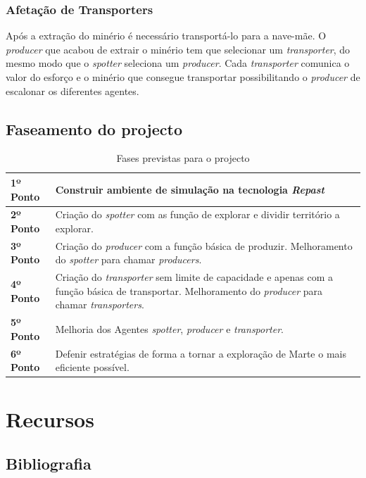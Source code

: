 \documentclass[12pt]{report}
\begin{document}
\FloatBarrier
\subsection{Afetação de Transporters}
Após a extração do minério é necessário transportá-lo para a nave-mãe. O \emph{producer} que acabou de extrair o minério tem que selecionar 
um \emph{transporter}, do mesmo modo que o \emph{spotter} seleciona um \emph{producer}. Cada \emph{transporter} comunica o valor
do esforço e o minério que consegue transportar possibilitando o \emph{producer} de escalonar os diferentes agentes.

\section{Faseamento do projecto}

\begin{table}[htb]
\centering
\caption{Fases previstas para o projecto}
    \sffamily \begin{tabularx}{1.0\textwidth}{ p{3cm}  p{} }
    \hline
    \textbf{1º Ponto} \hfill & Construir ambiente de simulação na tecnologia \emph{Repast} \\ \hline
    \textbf{2º Ponto} \hfill & Criação do \emph{spotter} com as função de explorar e dividir território a explorar. \\ \hline
    \textbf{3º Ponto} \hfill & Criação do \emph{producer} com a função básica de produzir. Melhoramento do \emph{spotter} para chamar \emph{producers}. \\ \hline
    \textbf{4º Ponto} \hfill & Criação do \emph{transporter} sem limite de capacidade e apenas com a função básica de transportar. Melhoramento do \emph{producer} para chamar \emph{transporters}. \\ \hline
    \textbf{5º Ponto} \hfill & Melhoria dos Agentes \emph{spotter}, \emph{producer} e \emph{transporter}. \\ \hline
    \textbf{6º Ponto} \hfill & Defenir estratégias de forma a tornar a exploração de Marte o mais eficiente possível. \\ \hline
    \end{tabularx} \normalfont
\end{table}

\chapter{Recursos}
\section{Bibliografia}
\end{document}
